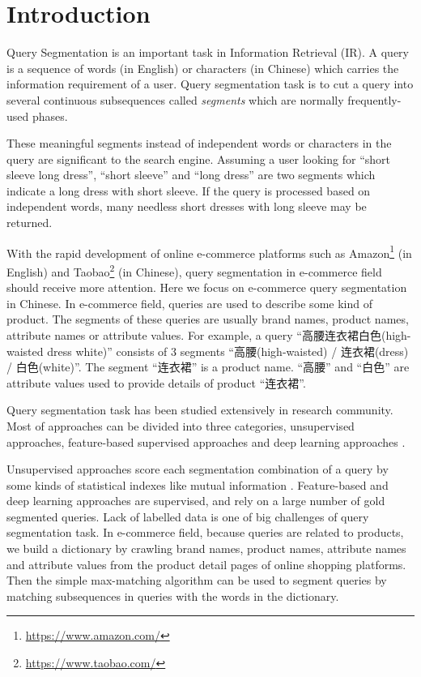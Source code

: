\section{Introduction}
\label{sec:intro}

Query Segmentation is an important task in Information Retrieval (IR). A query is a sequence of words (in English) or characters (in Chinese) which carries the information requirement of a user. Query segmentation task is to cut a query into several continuous subsequences called \emph{segments} which are normally frequently-used phases.

These meaningful segments instead of independent words or characters in the query are significant to the search engine. Assuming a user looking for ``short sleeve long dress'', ``short sleeve'' and ``long dress'' are two segments which indicate a long dress with short sleeve. If the query is processed based on independent words, many needless short dresses with long sleeve may be returned. %


With the rapid development of online e-commerce platforms such as Amazon\footnote{\url{https://www.amazon.com/}} (in English) and Taobao\footnote{\url{https://www.taobao.com/}} (in Chinese), query segmentation in e-commerce field should receive more attention. Here we focus on e-commerce query segmentation in Chinese. In e-commerce field, queries are used to describe some kind of product. The segments of these queries are usually brand names, product names, attribute names or attribute values. For example, a query ``高腰连衣裙白色(high-waisted dress white)'' consists of $3$ segments ``高腰(high-waisted) / 连衣裙(dress) / 白色(white)''. The segment ``连衣裙'' is a product name. ``高腰'' and ``白色'' are attribute values used to provide details of product ``连衣裙''.

Query segmentation task has been studied extensively in research community. Most of approaches can be divided into three categories, unsupervised approaches\cite{risvik_query_2003,zhang_query_2009,kiseleva_unsupervised_2010,mishra_unsupervised_2011,parikh_segmentation_2013,hagen_power_2010,hagen_query_2011,tan_unsupervised_2008,huang_exploring_2010}, feature-based supervised approaches \cite{bergsma_learning_2007,yu_query_2009,du_perceptron-based_2014} and deep learning approaches \cite{kale_towards_2017,lin_query_2017}.

Unsupervised approaches score each segmentation combination of a query by some kinds of statistical indexes like mutual information \cite{risvik_query_2003}. Feature-based and deep learning approaches are supervised, and rely on a large number of gold segmented queries. Lack of labelled data is one of big challenges of query segmentation task. In e-commerce field, because queries are related to products, we build a dictionary by crawling brand names, product names, attribute names and attribute values from the product detail pages of online shopping platforms. Then the simple max-matching algorithm can be used to segment queries by matching subsequences in queries with the words in the dictionary.

